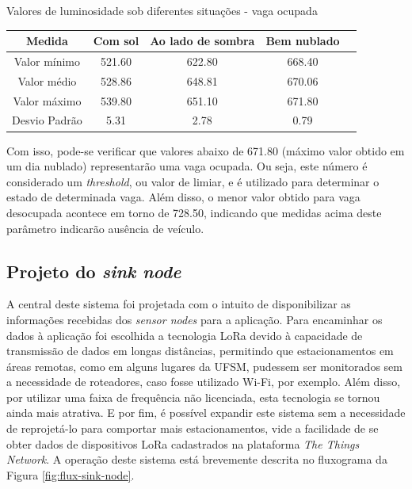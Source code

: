 \documentclass[oneside,openright,12pt]{ufsm_2015} %
\begin{document}
    \begin{quadro}[H]\label{quadro:valores-vaga-ocupada}
   	    \caption{Valores de luminosidade sob diferentes situações - vaga ocupada}
	    \centering
	    \begin{tabular}{| c | c |c |c |c |}
	    \hline
	    Medida & Com sol & Ao lado de sombra & Bem nublado\\
	    \hline
	    Valor mínimo & 521.60 & 622.80 & 668.40\\
	    \hline
	    Valor médio & 528.86 & 648.81 & 670.06\\
	    \hline
	    Valor máximo & 539.80 & 651.10 & 671.80\\
	    \hline
	    Desvio Padrão & 5.31 & 2.78 & 0.79\\
	    \hline
	    \end{tabular}
	    \vspace{\baselineskip} %
    \end{quadro}
    
    Com isso, pode-se verificar que valores abaixo de 671.80 (máximo valor obtido em um dia nublado) representarão uma vaga ocupada. Ou seja, este número é considerado um \textit{threshold}, ou valor de limiar, e é utilizado para determinar o estado de determinada vaga. Além disso, o menor valor obtido para vaga desocupada acontece em torno de 728.50, indicando que medidas acima deste parâmetro indicarão ausência de veículo.
    
    
    \subsection{Projeto do \textit{sink node}}
    A central deste sistema foi projetada com o intuito de disponibilizar as informações recebidas dos \textit{sensor nodes} para a aplicação. Para encaminhar os dados à aplicação foi escolhida a tecnologia LoRa devido à capacidade de transmissão de dados em longas distâncias, permitindo que estacionamentos em áreas remotas, como em alguns lugares da UFSM, pudessem ser monitorados sem a necessidade de roteadores, caso fosse utilizado Wi-Fi, por exemplo. Além disso, por utilizar uma faixa de frequência não licenciada, esta tecnologia se tornou ainda mais atrativa. E por fim, é possível expandir este sistema sem a necessidade de reprojetá-lo para comportar mais estacionamentos, vide a facilidade de se obter dados de dispositivos LoRa cadastrados na plataforma \textit{The Things Network}. A operação deste sistema está brevemente descrita no fluxograma da Figura \ref{fig:flux-sink-node}.
    
\end{document}
